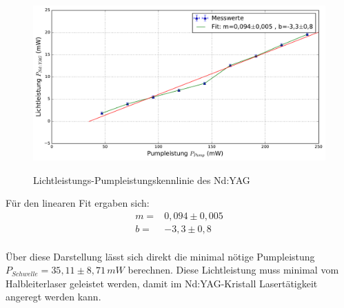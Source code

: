 \documentclass[twoside,colorback,accentcolor=tud4c,11pt]{tudreport}
\begin{document}
\begin{figure}[H]
\centering
   	\begin{minipage}[b]{0.85\textwidth}
   	\includegraphics[width=\textwidth]{graphics/kenn_ndyag_pl.pdf}
  	\label{kenyag2}
   	\end{minipage}
\caption{Lichtleistungs-Pumpleistungskennlinie des Nd:YAG}	
\end{figure}
Für den linearen Fit ergaben sich:
\begin{align}
m=& 0,094 \pm 0,005\\
b=& -3,3 \pm 0,8
\end{align}\\
Über diese Darstellung lässt sich direkt die minimal nötige Pumpleistung $P_{Schwelle}=35,11\pm 8,71\,\si{mW} $ berechnen. Diese Lichtleistung muss minimal vom Halbleiterlaser geleistet werden, damit im Nd:YAG-Kristall Lasertätigkeit angeregt werden kann.
\pagebreak
\end{document}
